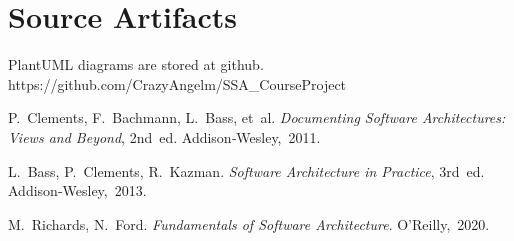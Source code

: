 \documentclass[11pt,a4paper]{article}
\begin{document}
\section{Source Artifacts}
PlantUML diagrams are stored at github.
https://github.com/CrazyAngelm/SSA_CourseProject

\begin{thebibliography}{9}
P. Clements, F. Bachmann, L. Bass, et al.  
\textit{Documenting Software Architectures: Views and Beyond}, 2nd ed.  
Addison‑Wesley, 2011.

L. Bass, P. Clements, R. Kazman.  
\textit{Software Architecture in Practice}, 3rd ed.  
Addison‑Wesley, 2013.

M. Richards, N. Ford.  
\textit{Fundamentals of Software Architecture}.  
O’Reilly, 2020.
\end{thebibliography}
\end{document}
